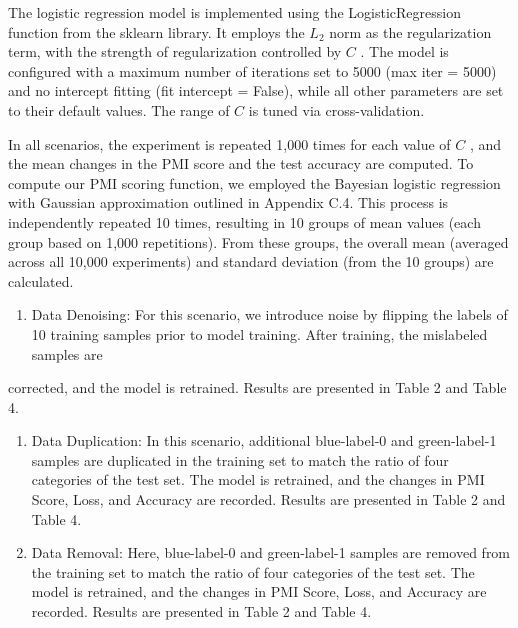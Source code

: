 The logistic regression model is implemented using the
LogisticRegression function from the sklearn library. It employs the
\(L _ { 2 }\) norm as the regularization term, with the strength of
regularization controlled by \(C\) . The model is configured with a
maximum number of iterations set to 5000 (max iter = 5000) and no
intercept fitting (fit intercept = False), while all other parameters
are set to their default values. The range of \(C\) is tuned via
cross-validation.

In all scenarios, the experiment is repeated 1,000 times for each value
of \(C\) , and the mean changes in the PMI score and the test accuracy
are computed. To compute our PMI scoring function, we employed the
Bayesian logistic regression with Gaussian approximation outlined in
Appendix C.4. This process is independently repeated 10 times, resulting
in 10 groups of mean values (each group based on 1,000 repetitions).
From these groups, the overall mean (averaged across all 10,000
experiments) and standard deviation (from the 10 groups) are calculated.

\begin{enumerate}
\def\labelenumi{\arabic{enumi}.}
\tightlist
\item
  Data Denoising: For this scenario, we introduce noise by flipping the
  labels of\\
  10 training samples prior to model training. After training, the
  mislabeled samples are
\end{enumerate}

corrected, and the model is retrained. Results are presented in Table 2
and Table 4.

\begin{enumerate}
\def\labelenumi{\arabic{enumi}.}
\setcounter{enumi}{1}
\item
  Data Duplication: In this scenario, additional blue-label-0 and
  green-label-1 samples are duplicated in the training set to match the
  ratio of four categories of the test set. The model is retrained, and
  the changes in PMI Score, Loss, and Accuracy are recorded. Results are
  presented in Table 2 and Table 4.
\item
  Data Removal: Here, blue-label-0 and green-label-1 samples are removed
  from the training set to match the ratio of four categories of the
  test set. The model is retrained, and the changes in PMI Score, Loss,
  and Accuracy are recorded. Results are presented in Table 2 and Table
  4.
\end{enumerate}

